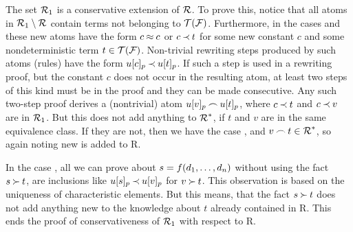 \begin{PROOF}
The set \(\C R_1\) is a conservative extension of \(\C R\). To prove this,
notice that all atoms in \(\C R_1\setminus\C R\) contain terms not
belonging to \(\Terms\Funcs\). Furthermore, in the cases  and
 these new atoms have the form \(c\Eq c\) or \(c\Incl t\) for some
new constant $c$ and some nondeterministic term \(t\in\Terms\Funcs\). Non-trivial
rewriting steps produced by such atoms (rules) have the form \(u[c]_p\Incl
u[t]_p\). If such a step is used in a rewriting proof, but the constant \(c\)
does not occur in the resulting atom, at least two steps of this kind must be
in the proof and they can be made consecutive. Any such two-step proof derives a
(nontrivial) atom \(u[v]_p\Int u[t]_p\), where \(c\Incl t\) and \(c\Incl v\)
are in \(\C R_1\). But this does not add anything to \(\C R^\ast\), if \(t\) and
\(v\) are in the same equivalence class. If they are not, then we have the
case , and \(v\Int t\in\C R^\ast\), so again noting new is added
to \C R. 

In the case , all we can prove about
\(s=f(\List dn,)\) without using the fact \(s\Cont t\), are inclusions like
\(u[s]_p\Incl u[v]_p\) for \(v\Cont t\). This observation is based on the
uniqueness of characteristic elements. But this means, that the fact \(s\Cont
t\) does not add anything new to the knowledge about \(t\) already contained in \C
R. This ends the proof of conservativeness of \(\C R_1\) with respect to \C R.


\end{PROOF}
